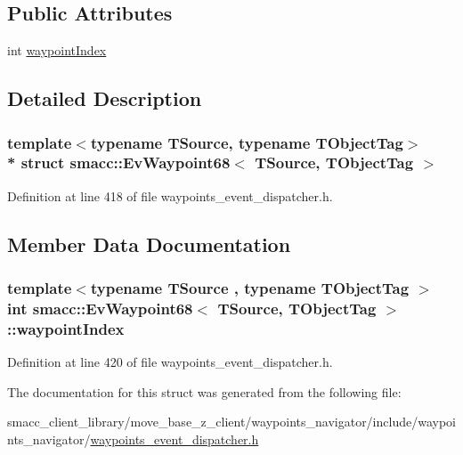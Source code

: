 \subsection*{Public Attributes}
\begin{DoxyCompactItemize}
\item 
int \hyperlink{structsmacc_1_1EvWaypoint68_ac65dca2bb24ab5f0e0f029da59f9a50f}{waypoint\+Index}
\end{DoxyCompactItemize}


\subsection{Detailed Description}
\subsubsection*{template$<$typename T\+Source, typename T\+Object\+Tag$>$\\*
struct smacc\+::\+Ev\+Waypoint68$<$ T\+Source, T\+Object\+Tag $>$}



Definition at line 418 of file waypoints\+\_\+event\+\_\+dispatcher.\+h.



\subsection{Member Data Documentation}
\subsubsection[{\texorpdfstring{waypoint\+Index}{waypointIndex}}]{\setlength{\rightskip}{0pt plus 5cm}template$<$typename T\+Source , typename T\+Object\+Tag $>$ int {\bf smacc\+::\+Ev\+Waypoint68}$<$ T\+Source, T\+Object\+Tag $>$\+::waypoint\+Index}\hypertarget{structsmacc_1_1EvWaypoint68_ac65dca2bb24ab5f0e0f029da59f9a50f}{}\label{structsmacc_1_1EvWaypoint68_ac65dca2bb24ab5f0e0f029da59f9a50f}


Definition at line 420 of file waypoints\+\_\+event\+\_\+dispatcher.\+h.



The documentation for this struct was generated from the following file\+:\begin{DoxyCompactItemize}
\item 
smacc\+\_\+client\+\_\+library/move\+\_\+base\+\_\+z\+\_\+client/waypoints\+\_\+navigator/include/waypoints\+\_\+navigator/\hyperlink{waypoints__event__dispatcher_8h}{waypoints\+\_\+event\+\_\+dispatcher.\+h}\end{DoxyCompactItemize}
